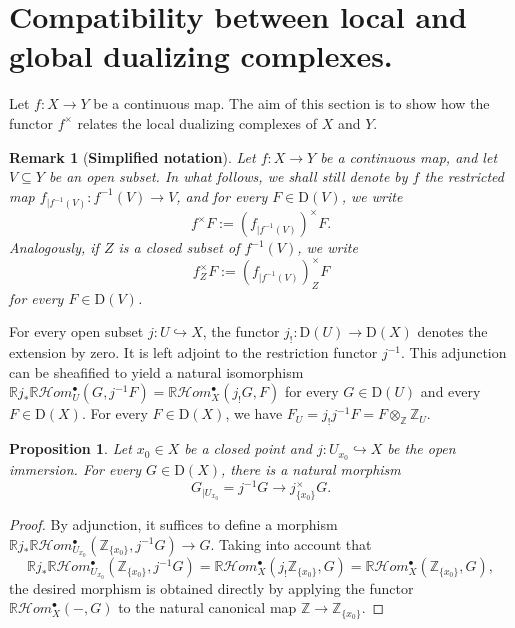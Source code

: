 \documentclass[amssymb,amscd,11pt,20pt]{amsart}
\newcommand{\ZZ}{{\mathbb Z}}
\newcommand{\RR}{\mathbb R}
\newcommand{\0}{\mathbf 0}
\newcommand{\pun}{{\scriptscriptstyle \bullet}}
\newcommand{\HHom}{\mathcal{H}om}
\theoremstyle{plain}
\newtheorem{prop}[thm]{Proposition}
\newtheorem{rem}[thm]{Remark}
\numberwithin{equation}{thm}
\begin{document}
\section{  Compatibility between local and global dualizing complexes.}\label{loc-glob-compatibility}
\medskip

Let $f\colon X\to Y$ be a continuous map. The aim of this section is to show how the functor $f^\times$ relates the local dualizing complexes of $X$ and $Y$.

\begin{rem}[\bf Simplified notation]\label{notation}{\rm Let $f\colon X\to Y$ be a continuous map, and let $V\subseteq Y$ be an open subset. In what follows, we shall still denote by $f$ the restricted map $f_{\vert f^{-1}(V)}\colon f^{-1}(V)\to V$, and for every  $F\in \mathrm{D}(V)$, we write $$f^\times F:=(f_{\vert f^{-1}(V)})^\times F.$$ 
Analogously, if $Z$ is a closed subset of $f^{-1}(V)$, we write
\[ f^\times_ZF:= (f_{\vert f^{-1}(V)})^\times_Z F \] for every  $F\in \mathrm{D}(V)$.}
\end{rem}

For every open subset $j\colon U\hookrightarrow X$, the functor $j_!\colon \mathrm{D}(U)\to \mathrm{D}(X)$ denotes the extension by zero. It is left adjoint to the restriction functor $j^{-1}$. This adjunction can be sheafified to yield a natural isomorphism $\RR j_*\RR\HHom_U^\pun(G,j^{-1}F)=\RR\HHom_X^\pun(j_!G,F)$ for every $G\in \mathrm{D}(U)$ and every $F\in \mathrm{D}(X)$. For every $F\in \mathrm{D}(X)$, we have $F_U=j_!j^{-1}F=F\otimes_\ZZ \ZZ_U$.  

\begin{prop}\label{restringirversuslocal} Let $x_0\in X$ be a closed point and $j\colon U_{x_0}\hookrightarrow X$ be the open immersion. For every $G\in \mathrm{D}(X)$, there is a natural morphism
\[ G_{\vert U_{x_0}}=j^{-1}G\longrightarrow j_{\{x_0\}}^\times G.\]
\end{prop}

\begin{proof} By adjunction, it suffices to define a morphism $ \RR j_* \RR\HHom_{U_{x_0}}^\pun(\ZZ_{\{x_0\}}, j^{-1}G)\to G$. Taking into account that $$ \RR j_* \RR\HHom_{U_{x_0}}^\pun(\ZZ_{\{x_0\}}, j^{-1}G)= \RR\HHom_{X}^\pun(j_!\ZZ_{\{x_0\}},  G) = \RR\HHom_{X}^\pun( \ZZ_{\{x_0\}},  G) ,$$ the desired morphism is obtained directly by applying the functor  $\RR\HHom_{X}^\pun( -,  G)$ to the natural canonical map $\ZZ\to\ZZ_{\{x_0\}}$.

\end{proof}
\end{document}
